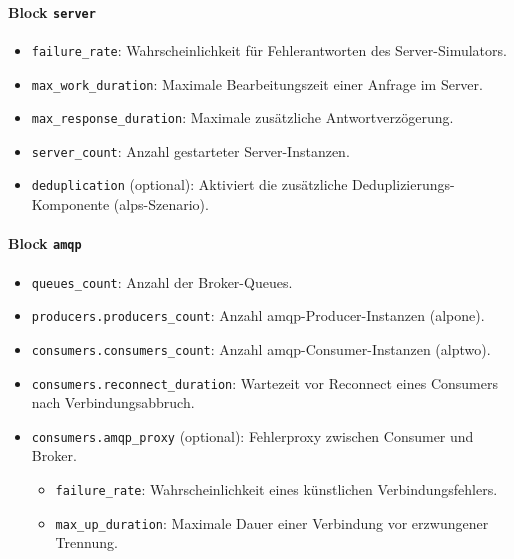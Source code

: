 \paragraph{Block \texttt{server}}
\begin{itemize}
    \item \texttt{failure\_rate}: Wahrscheinlichkeit für Fehlerantworten des Server-Simulators.
    \item \texttt{max\_work\_duration}: Maximale Bearbeitungszeit einer Anfrage im Server.
    \item \texttt{max\_response\_duration}: Maximale zusätzliche Antwortverzögerung.
    \item \texttt{server\_count}: Anzahl gestarteter Server-Instanzen.
    \item \texttt{deduplication} (optional): Aktiviert die zusätzliche Deduplizierungs-Komponente (\gls{alps}-Szenario).
\end{itemize}

\paragraph{Block \texttt{amqp}}
\begin{itemize}
    \item \texttt{queues\_count}: Anzahl der Broker-Queues.
    \item \texttt{producers.producers\_count}: Anzahl \gls{amqp}-Producer-Instanzen (\gls{alpone}).
    \item \texttt{consumers.consumers\_count}: Anzahl \gls{amqp}-Consumer-Instanzen (\gls{alptwo}).
    \item \texttt{consumers.reconnect\_duration}: Wartezeit vor Reconnect eines Consumers nach Verbindungsabbruch.
    \item \texttt{consumers.amqp\_proxy} (optional): Fehlerproxy zwischen Consumer und Broker.
          \begin{itemize}
              \item \texttt{failure\_rate}: Wahrscheinlichkeit eines künstlichen Verbindungsfehlers.
              \item \texttt{max\_up\_duration}: Maximale Dauer einer Verbindung vor erzwungener Trennung.
          \end{itemize}
\end{itemize}

